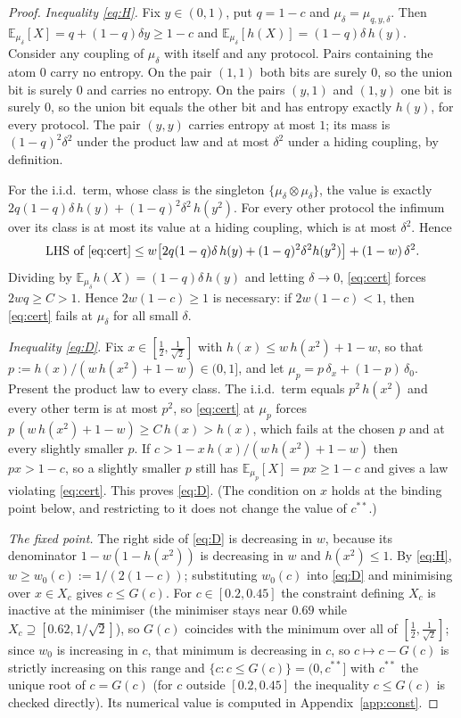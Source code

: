\documentclass[11pt,a4paper]{article}
\theoremstyle{definition}
\theoremstyle{remark}
\newcommand{\E}{\mathbb{E}}
\newcommand{\ent}{h}
\begin{document}
\begin{proof}
\emph{Inequality \eqref{eq:H}.} Fix $y\in(0,1)$, put $q=1-c$ and $\mu_\delta=\mu_{q,y,\delta}$. Then $\E_{\mu_\delta}[X]=q+(1-q)\delta y\ge1-c$ and $\E_{\mu_\delta}[\ent(X)]=(1-q)\delta\,\ent(y)$. Consider any coupling of $\mu_\delta$ with itself and any protocol. Pairs containing the atom $0$ carry no entropy. On the pair $(1,1)$ both bits are surely $0$, so the union bit is surely $0$ and carries no entropy. On the pairs $(y,1)$ and $(1,y)$ one bit is surely $0$, so the union bit equals the other bit and has entropy exactly $\ent(y)$, for every protocol. The pair $(y,y)$ carries entropy at most $1$; its mass is $(1-q)^2\delta^2$ under the product law and at most $\delta^2$ under a hiding coupling, by definition.

For the i.i.d.\ term, whose class is the singleton $\{\mu_\delta\otimes\mu_\delta\}$, the value is exactly $2q(1-q)\delta\,\ent(y)+(1-q)^2\delta^2\,\ent(y^2)$. For every other protocol the infimum over its class is at most its value at a hiding coupling, which is at most $\delta^2$. Hence
\[\text{LHS of \eqref{eq:cert}}\le w\big[2q(1-q)\delta\,\ent(y)+(1-q)^2\delta^2\ent(y^2)\big]+(1-w)\,\delta^2 .\]
Dividing by $\E_{\mu_\delta}\ent(X)=(1-q)\delta\,\ent(y)$ and letting $\delta\to0$, \eqref{eq:cert} forces $2wq\ge C>1$. Hence $2w(1-c)\ge1$ is necessary: if $2w(1-c)<1$, then \eqref{eq:cert} fails at $\mu_\delta$ for all small $\delta$.

\emph{Inequality \eqref{eq:D}.} Fix $x\in[\frac12,\frac1{\sqrt2}]$ with $\ent(x)\le w\,\ent(x^2)+1-w$, so that $p:=\ent(x)/(w\,\ent(x^2)+1-w)\in(0,1]$, and let $\mu_p=p\,\delta_x+(1-p)\,\delta_0$. Present the product law to every class. The i.i.d.\ term equals $p^2\,\ent(x^2)$ and every other term is at most $p^2$, so \eqref{eq:cert} at $\mu_p$ forces $p\,(w\,\ent(x^2)+1-w)\ge C\,\ent(x)>\ent(x)$, which fails at the chosen $p$ and at every slightly smaller $p$. If $c>1-x\,\ent(x)/(w\,\ent(x^2)+1-w)$ then $px>1-c$, so a slightly smaller $p$ still has $\E_{\mu_p}[X]=px\ge1-c$ and gives a law violating \eqref{eq:cert}. This proves \eqref{eq:D}. (The condition on $x$ holds at the binding point below, and restricting to it does not change the value of $c^{**}$.)

\emph{The fixed point.} The right side of \eqref{eq:D} is decreasing in $w$, because its denominator $1-w(1-\ent(x^2))$ is decreasing in $w$ and $\ent(x^2)\le1$. By \eqref{eq:H}, $w\ge w_0(c):=1/(2(1-c))$; substituting $w_0(c)$ into \eqref{eq:D} and minimising over $x\in X_c$ gives $c\le G(c)$. For $c\in[0.2,0.45]$ the constraint defining $X_c$ is inactive at the minimiser (the minimiser stays near $0.69$ while $X_c\supseteq[0.62,1/\sqrt2]$), so $G(c)$ coincides with the minimum over all of $[\frac12,\frac1{\sqrt2}]$; since $w_0$ is increasing in $c$, that minimum is decreasing in $c$, so $c\mapsto c-G(c)$ is strictly increasing on this range and $\{c:c\le G(c)\}=(0,c^{**}]$ with $c^{**}$ the unique root of $c=G(c)$ (for $c$ outside $[0.2,0.45]$ the inequality $c\le G(c)$ is checked directly). Its numerical value is computed in Appendix~\ref{app:const}.
\end{proof}
\end{document}
